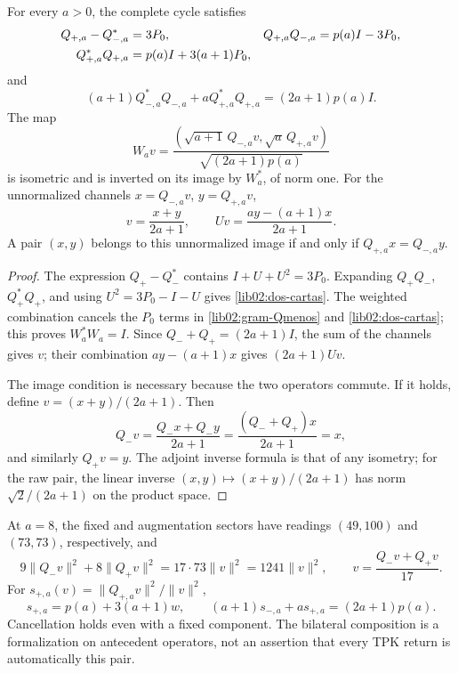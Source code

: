 \begin{theorem}
\label{lib02:balance-bilateral}
For every \(a>0\), the complete cycle satisfies
\begin{align}
 Q_{+,a}-Q_{-,a}^*&=3P_0,&
 Q_{+,a}Q_{-,a}&=p(a)I-3P_0,\notag\\
 Q_{+,a}^*Q_{+,a}&=p(a)I+3(a+1)P_0,
 \label{lib02:dos-cartas}
\end{align}
and
\begin{equation}
 (a+1)Q_{-,a}^*Q_{-,a}
 +aQ_{+,a}^*Q_{+,a}=(2a+1)p(a)I.
 \label{lib02:balance-pesado}
\end{equation}
The map
\begin{equation}
 W_av=\frac{(\sqrt{a+1}\,Q_{-,a}v,
                    \sqrt a\,Q_{+,a}v)}{\sqrt{(2a+1)p(a)}}
 \label{lib02:W}
\end{equation}
is isometric and is inverted on its image by \(W_a^*\), of norm one. For the unnormalized channels \(x=Q_{-,a}v\), \(y=Q_{+,a}v\),
\begin{equation}
 v=\frac{x+y}{2a+1},\qquad
 Uv=\frac{ay-(a+1)x}{2a+1}.
 \label{lib02:reconstruccion-bilateral}
\end{equation}
A pair \((x,y)\) belongs to this unnormalized image if and only if \(Q_{+,a}x=Q_{-,a}y\).
\end{theorem}
\begin{proof}
The expression \(Q_+-Q_-^*\) contains \(I+U+U^2=3P_0\). Expanding \(Q_+Q_-\), \(Q_+^*Q_+\), and using \(U^2=3P_0-I-U\) gives \eqref{lib02:dos-cartas}. The weighted combination cancels the \(P_0\) terms in \eqref{lib02:gram-Qmenos} and \eqref{lib02:dos-cartas}; this proves \(W_a^*W_a=I\). Since \(Q_-+Q_+=(2a+1)I\), the sum of the channels gives \(v\); their combination \(ay-(a+1)x\) gives \((2a+1)Uv\).

The image condition is necessary because the two operators commute. If it holds, define \(v=(x+y)/(2a+1)\). Then
\[
 Q_-v=\frac{Q_-x+Q_-y}{2a+1}
 =\frac{(Q_-+Q_+)x}{2a+1}=x,
\]
and similarly \(Q_+v=y\). The adjoint inverse formula is that of any isometry; for the raw pair, the linear inverse \((x,y)\mapsto(x+y)/(2a+1)\) has norm \(\sqrt2/(2a+1)\) on the product space.
\end{proof}

At \(a=8\), the fixed and augmentation sectors have readings \((49,100)\) and \((73,73)\), respectively, and
\[
 9\|Q_-v\|^2+8\|Q_+v\|^2=17\cdot73\|v\|^2=1241\|v\|^2,
 \qquad v=\frac{Q_-v+Q_+v}{17}.
\]
For \(s_{+,a}(v)=\|Q_{+,a}v\|^2/\|v\|^2\),
\[
 s_{+,a}=p(a)+3(a+1)w,
 \qquad (a+1)s_{-,a}+a s_{+,a}=(2a+1)p(a).
\]
Cancellation holds even with a fixed component. The bilateral composition is a formalization on antecedent operators, not an assertion that every TPK return is automatically this pair.

